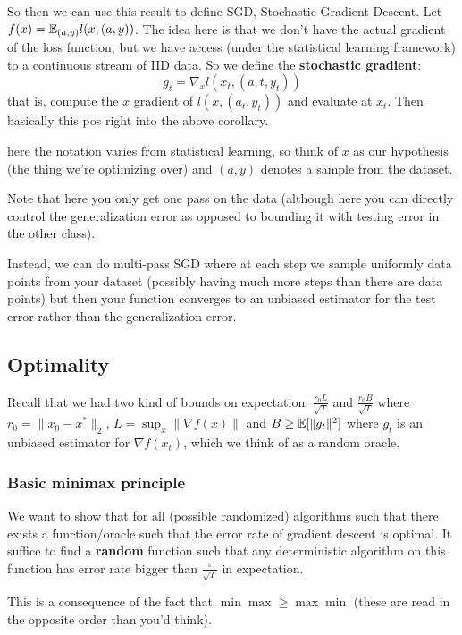 \documentclass[12pt]{article}
\begin{document}
So then we can use this result to define SGD, Stochastic Gradient Descent. Let $f(x)=\mathbb{E}_{(a,y)}l(x,(a,y))$.
The idea here is that we don't have the actual gradient of the loss function, but we have access (under the statistical learning framework) to a continuous stream of IID data.
So we define the \textbf{stochastic gradient}:
\[g_t=\nabla_x l(x_t,(a,t,y_t))\]
that is, compute the $x$ gradient of $l(x,(a_t,y_t))$ and evaluate at $x_t$. Then basically this pos right into the above corollary.

\begin{rmk}
	here the notation varies from statistical learning, so think of $x$ as our hypothesis (the thing we're optimizing over) and $(a,y)$ denotes a sample from the dataset.
\end{rmk}

Note that here you only get one pass on the data (although here you can directly control the generalization error as opposed to bounding it with testing error in the other class).

Instead, we can do multi-pass SGD where at each step we sample uniformly data points from your dataset (possibly having much more steps than there are data points) but then your function converges to an unbiased estimator for the test error rather than the generalization error.

\subsection{Optimality}
Recall that we had two kind of bounds on expectation: $\frac{r_0L}{\sqrt{T}}$ and $\frac{r_0B}{\sqrt{T}}$ where $r_0=\|x_0-x^\ast\|_2$,
$L=\sup_x\|\nabla f(x)\|$ and $B\ge \mathbb{E}[\|g_t\|^2]$ where $g_t$ is an unbiased estimator for $\nabla f(x_t)$, which we think of as a random oracle.

\subsubsection{Basic minimax principle}
We want to show that for all (possible randomized) algorithms such that there exists a function/oracle such that the error rate of gradient descent is optimal.
It suffice to find a \textbf{random} function such that any deterministic algorithm on this function has error rate bigger than $\frac{\square}{\sqrt{T}}$ in expectation.

This is a consequence of the fact that $\min\max\ge\max\min$ (these are read in the opposite order than you'd think).
\end{document}
